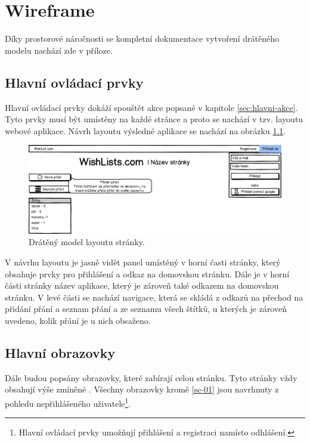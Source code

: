 \chapter{Wireframe}
\label{chp:wireframe}
Díky prostorové náročnosti se kompletní dokumentace vytvoření drátěného modelu nachází zde v příloze.

\section{Hlavní ovládací prvky}
\label{sec:hlavni-ovladaci-prvky}
Hlavní ovládací prvky dokáží spouštět akce popsané v kapitole \ref{sec:hlavni-akce}. Tyto prvky musí být umístěny na každé stránce a proto se nachází v tzv. layoutu webové aplikace. Návrh layoutu výsledné aplikace se nachází na obrázku \ref{fig:mock-layout}.

\begin{figure}[htb]
\begin{center}
\includegraphics[width=130mm]{./pictures/mock/layout.png}
\caption{Drátěný model layoutu stránky.}
\label{fig:mock-layout}
\end{center}
\end{figure}

V návrhu layoutu je jasně vidět panel umístěný v horní časti stránky, který obsahuje prvky pro přihlášení a odkaz na domovskou stránku. Dále je v horní části stránky název aplikace, který je zároveň také odkazem na domovskou stránku. V levé části se nachází navigace, která se skládá z odkazů na přechod na přidání přání a seznam přání a ze seznamu všech štítků, u kterých je zároveň uvedeno, kolik přání je u nich obsaženo.

\section{Hlavní obrazovky}
Dále budou popsány obrazovky, které zabírají celou stránku. Tyto stránky vždy obsahují výše zmíněné . Všechny obrazovky kromě \ref{sc-01} jsou navrhnuty z pohledu nepřihlášeného uživatele\footnote{Hlavní ovládací prvky umožňují přihlášení a registraci namísto odhlášení.}.

